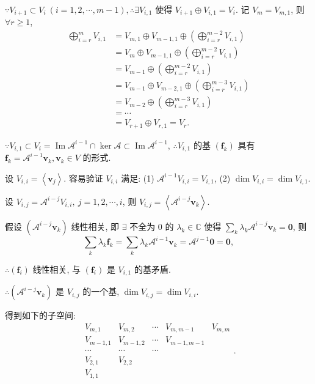 \documentclass{ctexart}
\begin{document}
$\because V_{i+1}\subset V_i\ (i=1,2,\cdots,m-1),\therefore\exists V_{i,1}$ 使得 $V_{i+1}\oplus V_{i,1}=V_i$. 记 $V_m=V_{m,1}$, 则 $\forall r\geq1$,
\begin{equation}\label{eq4.7}
    \begin{aligned}
        \bigoplus\limits_{i=r}^mV_{i,1} & =V_{m,1}\oplus V_{m-1,1}\oplus\left(\bigoplus\limits_{i=r}^{m-2}V_{i,1}\right) \\
        & =V_m\oplus V_{m-1,1}\oplus\left(\bigoplus\limits_{i=r}^{m-2}V_{i,1}\right) \\
        & =V_{m-1}\oplus\left(\bigoplus\limits_{i=r}^{m-2}V_{i,1}\right) \\
        & =V_{m-1}\oplus V_{m-2,1}\oplus\left(\bigoplus\limits_{i=r}^{m-3}V_{i,1}\right) \\
        & =V_{m-2}\oplus\left(\bigoplus\limits_{i=r}^{m-3}V_{i,1}\right) \\
        & =\cdots \\
        & =V_{r+1}\oplus V_{r,1}=V_r.
    \end{aligned}
\end{equation}

$\because V_{i,1}\subset V_i=\operatorname{Im}\mathcal{A}^{i-1}\cap\ker\mathcal{A}\subset\operatorname{Im}\mathcal{A}^{i-1}$, $\therefore V_{i,1}$ 的基 $(\boldsymbol{f}_k)$ 具有 $\boldsymbol{f}_k=\mathcal{A}^{i-1}\boldsymbol{v}_k,\boldsymbol{v}_k\in V$ 的形式.

设 $V_{i,i}=\left<\boldsymbol{v}_j\right>$. 容易验证 $V_{i,i}$ 满足: (1) $\mathcal{A}^{i-1}V_{i,i}=V_{i,1}$, (2) $\dim V_{i,i}=\dim V_{i,1}$.

设 $V_{i,j}=\mathcal{A}^{i-j}V_{i,i},\ j=1,2,\cdots,i$, 则 $V_{i,j}=\left<\mathcal{A}^{i-j}\boldsymbol{v}_k\right>$.

假设 $(\mathcal{A}^{i-j}\boldsymbol{v}_k)$ 线性相关, 即 $\exists$ 不全为 $0$ 的 $\lambda_k\in\mathbb{C}$ 使得 $\sum\limits_k\lambda_k\mathcal{A}^{i-j}\boldsymbol{v}_k=\boldsymbol{0}$, 则
\[\sum\limits_k\lambda_k\boldsymbol{f}_k=\sum\limits_k\lambda_k\mathcal{A}^{i-1}\boldsymbol{v}_k=\mathcal{A}^{j-1}\boldsymbol{0}=\boldsymbol{0},\]

$\therefore(\boldsymbol{f}_i)$ 线性相关, 与 $(\boldsymbol{f}_i)$ 是 $V_{i,1}$ 的基矛盾.

$\therefore(\mathcal{A}^{i-j}\boldsymbol{v}_k)$ 是 $V_{i,j}$ 的一个基, $\dim V_{i,j}=\dim V_{i,i}$.

得到如下的子空间:
\begin{equation}\label{eq4.8}
    \begin{matrix}
        V_{m,1} & V_{m,2} & \cdots & V_{m,m-1} & V_{m,m} \\
        V_{m-1,1} & V_{m-1,2} & \cdots & V_{m-1,m-1} \\
        \cdots & \cdots & \cdots \\
        V_{2,1} & V_{2,2} \\
        V_{1,1}
    \end{matrix}.
\end{equation}
\end{document}
